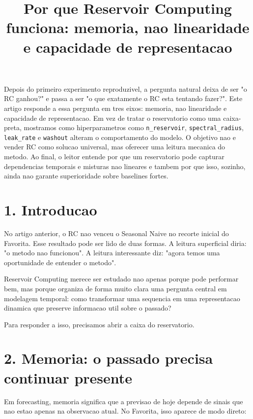 \documentclass[12pt]{article}
\title{Por que Reservoir Computing funciona: memoria, nao linearidade e capacidade de representacao}
\author{}
\begin{document}
\maketitle

\begin{resumo}
Depois do primeiro experimento reproduzivel, a pergunta natural deixa de ser "o RC ganhou?" e passa a ser "o que exatamente o RC esta tentando fazer?". Este artigo responde a essa pergunta em tres eixos: memoria, nao linearidade e capacidade de representacao. Em vez de tratar o reservatorio como uma caixa-preta, mostramos como hiperparametros como \texttt{n\_reservoir}, \texttt{spectral\_radius}, \texttt{leak\_rate} e \texttt{washout} alteram o comportamento do modelo. O objetivo nao e vender RC como solucao universal, mas oferecer uma leitura mecanica do metodo. Ao final, o leitor entende por que um reservatorio pode capturar dependencias temporais e misturas nao lineares e tambem por que isso, sozinho, ainda nao garante superioridade sobre baselines fortes.
\end{resumo}

\section{1. Introducao}\label{1-introducao}

No artigo anterior, o RC nao venceu o Seasonal Naive no recorte inicial do Favorita. Esse resultado pode ser lido de duas formas. A leitura superficial diria: "o metodo nao funcionou". A leitura interessante diz: "agora temos uma oportunidade de entender o metodo".

Reservoir Computing merece ser estudado nao apenas porque pode performar bem, mas porque organiza de forma muito clara uma pergunta central em modelagem temporal: como transformar uma sequencia em uma representacao dinamica que preserve informacao util sobre o passado?

Para responder a isso, precisamos abrir a caixa do reservatorio.

\section{2. Memoria: o passado precisa continuar presente}\label{2-memoria-o-passado-precisa-continuar-presente}

Em forecasting, memoria significa que a previsao de hoje depende de sinais que nao estao apenas na observacao atual. No Favorita, isso aparece de modo direto:
\end{document}
